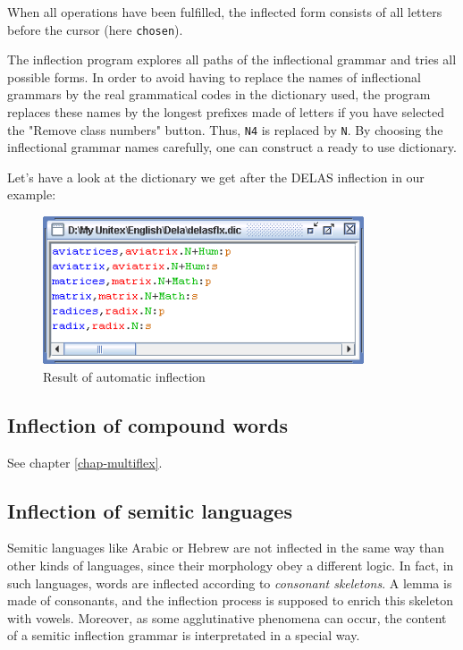 \bigskip
\noindent When all operations have been fulfilled, the inflected form
consists of all letters before the cursor (here \verb+chosen+).

\bigskip
\noindent The inflection program
explores all paths of the inflectional grammar and tries all possible forms. In
order to avoid having to replace the names of inflectional grammars by the real
grammatical codes in the dictionary used, the program replaces these names by the
longest prefixes made of letters if you have selected the "Remove class numbers"
button. Thus, \verb+N4+ is replaced by \verb+N+. By choosing the inflectional
grammar names carefully, one can construct a ready to use dictionary.

\bigskip
\noindent Let's have a look at the dictionary we get after the DELAS inflection in
our example:

\bigskip
\begin{figure}[h]
\begin{center}
\includegraphics[width=9.5cm]{resources/img/fig3-7.png}
\caption{Result of automatic inflection}
\end{center}
\end{figure}

\subsection{Inflection of compound words}
See chapter \ref{chap-multiflex}.

\subsection{Inflection of semitic languages}
Semitic languages like Arabic or Hebrew are not inflected in the same way than 
other kinds of languages, since their morphology obey a different logic. In
fact, in such languages, words are inflected according to \textit{consonant
skeletons}. A lemma is made of consonants, and the
inflection process is supposed to enrich this skeleton with vowels. Moreover, as
some agglutinative phenomena can occur, the content of a semitic inflection
grammar is interpretated in a special way.

